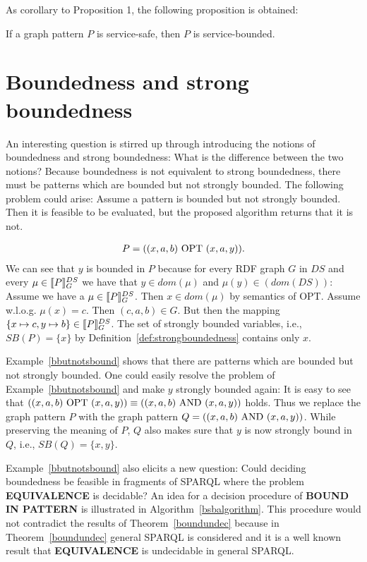As corollary to Proposition 1, the following proposition is obtained:
\begin{proposition}
	If a graph pattern $P$ is service-safe, then $P$ is service-bounded.
\end{proposition}

\section{Boundedness and strong boundedness}
An interesting question is stirred up through introducing the notions of
boundedness and strong boundedness: What is the difference between the two
notions? 
Because boundedness is not equivalent to strong boundedness, there
must be patterns which are bounded but not strongly bounded. The following problem could arise:
Assume a pattern is bounded but not strongly bounded. Then it is feasible to be evaluated, 
but the proposed algorithm returns that it is not.

\begin{example}\label{bbutnotsbound}
	\begin{align*}
		P = ((x,a, b) \mbox{ OPT } (x, a, y)).
	\end{align*}
	We can see that $y$ is bounded in $P$ because for every RDF graph $G$ in $DS$ and
	every $\mu \in \llbracket P \rrbracket^{DS}_G$ we have that $y \in dom(\mu)$ and
	$\mu(y) \in (dom(DS))$: Assume we have a $\mu \in \llbracket P \rrbracket^{DS}_G$. Then $x
	\in dom(\mu)$ by semantics of OPT. Assume w.l.o.g. $\mu(x) = c$. Then
	$(c,a, b) \in G$. But then the mapping $\{ x \mapsto c , y\mapsto b \}
	\in \llbracket P \rrbracket^{DS}_G$.
	The set of strongly bounded variables, i.e., $SB(P) = \{ x \}$ by
	Definition~\ref{def:strongboundedness} contains only $x$.
\end{example}
Example~\ref{bbutnotsbound} shows that there are patterns which are bounded but not strongly bounded. 
One could easily resolve the problem of Example~\ref{bbutnotsbound} and make $y$
strongly bounded again: 
It is easy to see that $((x,a, b) \mbox{ OPT } (x, a, y)) \equiv ((x,a, b) \mbox{ AND } (x, a,
y))$ holds. Thus we replace the graph pattern $P$ with the graph pattern $Q = ((x,a, b) \mbox{ AND } (x, a, y))$. 
While preserving the meaning of $P$, $Q$ also makes sure that $y$ is now strongly bound
in $Q$, i.e., $SB(Q) = \{ x, y\}$. 

Example~\ref{bbutnotsbound} also elicits a new question: Could deciding boundedness be
feasible in fragments of SPARQL where the problem \textbf{EQUIVALENCE} is
decidable? An idea for a decision procedure of \textbf{BOUND IN PATTERN} is illustrated
in Algorithm~\ref{bsbalgorithm}. This procedure would not contradict the results
of Theorem~\ref{boundundec} because in Theorem~\ref{boundundec} general SPARQL
is considered and it is a well known result that \textbf{EQUIVALENCE} is
undecidable in general SPARQL.

